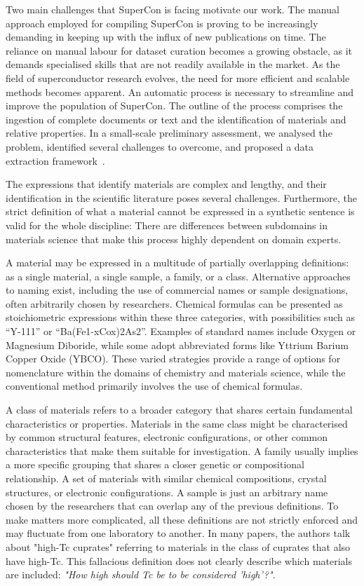 Two main challenges that SuperCon is facing motivate our work. 
The manual approach employed for compiling SuperCon is proving to be increasingly demanding in keeping up with the influx of new publications on time. The reliance on manual labour for dataset curation becomes a growing obstacle, as it demands specialised skills that are not readily available in the market. As the field of superconductor research evolves, the need for more efficient and scalable methods becomes apparent.
An automatic process is necessary to streamline and improve the population of SuperCon. 
The outline of the process comprises the ingestion of complete documents or text and the identification of materials and relative properties.  
In a small-scale preliminary assessment, we analysed the problem, identified several challenges to overcome, and proposed a data extraction framework~\cite{foppiano2019proposal}.

The expressions that identify materials are complex and lengthy, and their identification in the scientific literature poses several challenges.
Furthermore, the strict definition of what a material cannot be expressed in a synthetic sentence is valid for the whole discipline: There are differences between subdomains in materials science that make this process highly dependent on domain experts.

A material may be expressed in a multitude of partially overlapping definitions: as a single material, a single sample, a family, or a class.
Alternative approaches to naming exist, including the use of commercial names or sample designations, often arbitrarily chosen by researchers. Chemical formulas can be presented as stoichiometric expressions within these three categories, with possibilities such as ``Y-111'' or ``Ba(Fe1-xCox)2As2''. Examples of standard names include Oxygen or Magnesium Diboride, while some adopt abbreviated forms like Yttrium Barium Copper Oxide (YBCO). These varied strategies provide a range of options for nomenclature within the domains of chemistry and materials science, while the conventional method primarily involves the use of chemical formulas.

A class of materials refers to a broader category that shares certain fundamental characteristics or properties. Materials in the same class might be characterised by common structural features, electronic configurations, or other common characteristics that make them suitable for investigation. 
A family usually implies a more specific grouping that shares a closer genetic or compositional relationship. A set of materials with similar chemical compositions, crystal structures, or electronic configurations. 
A sample is just an arbitrary name chosen by the researchers that can overlap any of the previous definitions. 
To make matters more complicated, all these definitions are not strictly enforced and may fluctuate from one laboratory to another. 
In many papers, the authors talk about "high-Tc cuprates" referring to materials in the class of cuprates that also have high-Tc. This fallacious definition does not clearly describe which materials are included: \textit{"How high should Tc be to be considered 'high'?"}.

